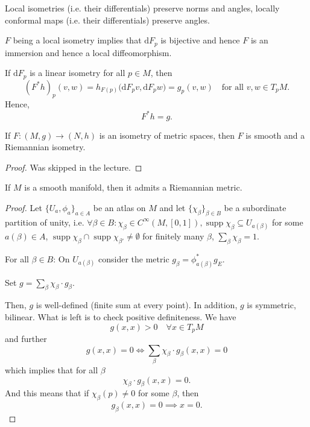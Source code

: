 Local isometries (i.e. their differentials) preserve norms and angles, locally conformal maps (i.e. their differentials) preserve angles.


$F$ being a local isometry implies that $\mathrm{d}F_p$ is bijective and hence $F$ is an immersion and hence a local diffeomorphism. 

If $\mathrm dF_p$ is a linear isometry for all $p \in M$, then
\[
(F^*h)_p(v,w)
= h_{F(p)}\big(\mathrm dF_p v, \mathrm dF_p w\big)
= g_p(v,w)
\quad \text{for all } v,w \in T_pM.
\]
Hence,
\[
F^*h = g.
\]


\begin{colorlem}{}{}
If \(F: (M, g) \to (N, h)\) is an isometry of metric spaces, then \(F\) is smooth and a Riemannian isometry.
\end{colorlem}
\begin{proof}
Was skipped in the lecture.
\end{proof}

\begin{colortheo}{}{}
If \(M\) is a smooth manifold, then it admits a Riemannian metric.
\end{colortheo}

\begin{proof}
Let \(\{U_a, \phi_a\}_{a \in A}\) be an atlas on \(M\) and let \(\{\chi_\beta\}_{\beta \in B}\) be a subordinate partition of unity, i.e. \(\forall \beta \in B: \chi_\beta \in C^\infty(M,[0,1]), \operatorname{supp} \chi_\beta \subseteq U_{a(\beta)}\) for some \(a(\beta) \in A\), \(\operatorname{supp} \chi_\beta \cap \operatorname{supp} \chi_{\beta'} \neq \emptyset\) for finitely many \(\beta\), \(\sum_\beta \chi_\beta = 1\).

For all \(\beta \in B\): On \(U_{a(\beta)}\) consider the metric \(g_\beta = \phi_{a(\beta)}^* g_E\).

Set \(g = \sum_{\beta} \chi_\beta \cdot g_\beta\).

Then, \(g\) is well-defined (finite sum at every point).
In addition, \(g\) is symmetric, bilinear. What is left is to check positive definiteness. We have
\[
g(x, x) > 0 \quad \forall x \in T_pM
\]
and further
\[
g(x, x) = 0 \iff \sum_\beta \chi_\beta \cdot g_\beta(x, x) = 0
\]
which implies that for all $\beta$
$$\chi_\beta \cdot g_\beta(x, x) = 0.$$
And this means that if $\chi_\beta(p) \neq 0$ for some $\beta$, then
\[g_\beta(x, x) = 0 \implies x = 0.
\]
\end{proof}




